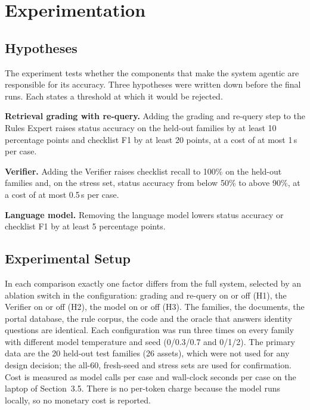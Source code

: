 \chapter{Experimentation}\label{ch:exp}
\section{Hypotheses}
The experiment tests whether the components that make the system agentic are responsible for its accuracy. Three hypotheses were written down before the final runs. Each states a threshold at which it would be rejected.

\begin{description}[leftmargin=1.4cm,labelwidth=1.1cm,itemsep=2pt]
\item[H1] \textbf{Retrieval grading with re-query.} Adding the grading and re-query step to the Rules Expert raises status accuracy on the held-out families by at least 10 percentage points and checklist F1 by at least 20 points, at a cost of at most 1\,s per case.
\item[H2] \textbf{Verifier.} Adding the Verifier raises checklist recall to 100\% on the held-out families and, on the stress set, status accuracy from below 50\% to above 90\%, at a cost of at most 0.5\,s per case.
\item[H3] \textbf{Language model.} Removing the language model lowers status accuracy or checklist F1 by at least 5 percentage points.
\end{description}

\section{Experimental Setup}
In each comparison exactly one factor differs from the full system, selected by an ablation switch in the configuration: grading and re-query on or off (H1), the Verifier on or off (H2), the model on or off (H3). The families, the documents, the portal database, the rule corpus, the code and the oracle that answers identity questions are identical. Each configuration was run three times on every family with different model temperature and seed (0/0.3/0.7 and 0/1/2). The primary data are the 20 held-out test families (26 assets), which were not used for any design decision; the all-60, fresh-seed and stress sets are used for confirmation. Cost is measured as model calls per case and wall-clock seconds per case on the laptop of Section~3.5. There is no per-token charge because the model runs locally, so no monetary cost is reported.

